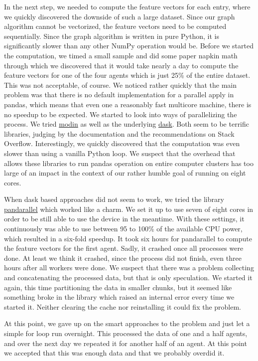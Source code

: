 \documentclass{article}
\begin{document}
In the next step, we needed to compute the feature vectors for each entry, where we quickly discovered the downside of such a large dataset. Since our graph algorithm cannot be vectorized, the feature vectors need to be computed sequentially. Since the graph algorithm is written in pure Python, it is significantly slower than any other NumPy operation would be. Before we started the computation, we timed a small sample and did some paper napkin math through which we discovered that it would take nearly a day to compute the feature vectors for one of the four agents which is just 25\% of the entire dataset. This was not acceptable, of course. We noticed rather quickly that the main problem was that there is no default implementation for a parallel apply in pandas, which means that even one a reasonably fast multicore machine, there is no speedup to be expected. We started to look into ways of parallelizing the process. We tried \href{https://github.com/modin-project/modin}{modin} as well as the underlying \href{https://docs.dask.org/en/stable/}{dask}. Both seem to be terrific libraries, judging by the documentation and the recommendations on Stack Overflow. Interestingly, we quickly discovered that the computation was even slower than using a vanilla Python loop. We suspect that the overhead that allows these libraries to run pandas operation on entire computer clusters has too large of an impact in the context of our rather humble goal of running on eight cores.

When dask based approaches did not seem to work, we tried the library \href{https://github.com/nalepae/pandarallel}{pandarallel} which worked like a charm. We set it up to use seven of eight cores in order to be still able to use the device in the meantime. With these settings, it continuously was able to use between 95 to 100\% of the available CPU power, which resulted in a six-fold speedup. It took six hours for pandarallel to compute the feature vectors for the first agent. Sadly, it crashed once all processes were done. At least we think it crashed, since the process did not finish, even three hours after all workers were done. We suspect that there was a problem collecting and concatenating the processed data, but that is only speculation. We started it again, this time partitioning the data in smaller chunks, but it seemed like something broke in the library which raised an internal error every time we started it. Neither clearing the cache nor reinstalling it could fix the problem.

At this point, we gave up on the smart approaches to the problem and just let a simple for loop run overnight. This processed the data of one and a half agents, and over the next day we repeated it for another half of an agent. At this point we accepted that this was enough data and that we probably overdid it.
\end{document}
